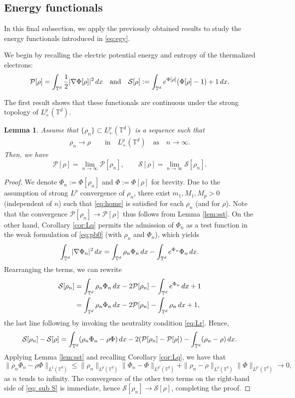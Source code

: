 \documentclass[11pt,reqno,a4paper]{amsart}
\newcommand{\intt}{\int_{\T^d}}
\newtheorem{lemma}{Lemma}[section]
\theoremstyle{definition}
\theoremstyle{remark}
\numberwithin{equation}{section}
\newcommand{\T} {\mathbb T}
\newcommand{\calP}{\mathcal P}
\newcommand{\calS}{\mathcal S}
\newcommand{\dx}{\textnormal{d}x}
\begin{document}
%
%
%
%
%
\subsection{Energy functionals}

In this final subsection, we apply the previously obtained results to study the energy functionals introduced in \eqref{eq:egy}. 

We begin by recalling the electric potential energy and entropy of the thermalized electrons:
\[
\calP[\rho]= \intt \frac{1}{2}|\nabla\Phi[\rho]|^2 \,\dx \quad \mbox{and} \quad  \calS[\rho]:= \intt e^{\Phi[\rho]}(\Phi[\rho]-1)+1 \,\dx.
\]

 
The first result shows that these functionals are continuous under the strong topology of $L^p_+(\T^d)$.

\begin{lemma}
\label{lem:ect:str}
    Assume that $\{\rho_n\}\subset L^p_+(\T^d)$ is a sequence such that
\begin{align*}
\rho_n \to \rho \qquad \text{in}\quad L^p_+(\T^d) \quad \mbox{as} \quad n \to \infty.
\end{align*}
Then, we have
\[
\displaystyle \calP[\rho] = \lim_{n \to \infty} \calP[\rho_n],\qquad \calS[\rho]=\lim_{n \to \infty} \calS[\rho_n].
\]
\end{lemma}
\begin{proof}
We denote $\Phi_n:=\Phi[\rho_n]$ and $\Phi:=\Phi[\rho]$ for brevity. Due to the assumption of strong $L^p$ convergence of $\rho_n$, there exist $m_1,M_1,M_p>0$ (independent of $n$) such that \eqref{eq:home} is satisfied for each $\rho_n$ (and for $\rho$). Note that the convergence $\calP[\rho_n]\to \calP[\rho]$ thus follows from Lemma \ref{lem:sst}. On the other hand, Corollary \ref{cor:Lq} permits the admission of $\Phi_n$ as a test function in the weak formulation of \eqref{eq:pb0} (with $\rho_n$ and $\Phi_n$), which yields
\[
\intt |\nabla \Phi_n|^2\,\dx = \intt \rho_n \Phi_n\,\dx - \intt e^{\Phi_n}\Phi_n\,\dx.
\]
Rearranging the terms, we can rewrite
\begin{align*}
\calS[\rho_n] &=  \intt \rho_n \Phi_n\,\dx  - 2\calP[\rho_n] - \intt e^{\Phi_n}\,\dx+1 \\
&= \intt \rho_n \Phi_n\,\dx - 2\calP[\rho_n] - \intt \rho_n\,\dx + 1,
\end{align*}
the last line following by invoking the neutrality condition \eqref{eq:Lr}. Hence,
\begin{equation} \label{eq: sub S}
\calS[\rho_n]  - \calS[\rho] =  \intt (\rho_n \Phi_n -\rho \Phi )\,\dx - 2(\calP[\rho_n] -\calP[\rho]) -\intt (\rho_n -\rho) \,\dx.
\end{equation}
Applying Lemma \ref{lem:sst} and recalling Corollary \ref{cor:Lq}, we have that
\[
\|\rho_n \Phi_n -\rho \Phi \|_{L^1(\T^d)} \le \|\rho_n\|_{L^p(\T^d)}\|\Phi_n-\Phi\|_{L^{p'}(\T^d)} + \|\rho_n-\rho\|_{L^p(\T^d)} \|\Phi\|_{L^{p'}(\T^d)} \to 0,
\]
as $n$ tends to infinity. The convergence of the other two terms on the right-hand side of \eqref{eq: sub S} is immediate, hence $\calS[\rho_n] \to \calS[\rho]$, completing the proof.
\end{proof}
\end{document}
